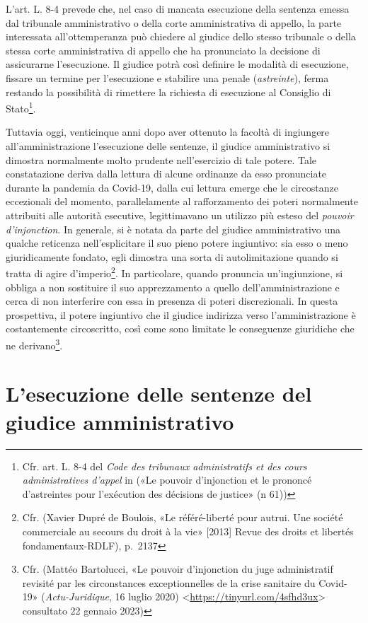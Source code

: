 \documentclass[12pt,it,a4paper,]{report}
\begin{document}
L'art. L. 8-4 prevede che, nel caso di mancata esecuzione della sentenza
emessa dal tribunale amministrativo o della corte amministrativa di
appello, la parte interessata all'ottemperanza può chiedere al giudice
dello stesso tribunale o della stessa corte amministrativa di appello
che ha pronunciato la decisione di assicurarne l'esecuzione. Il giudice
potrà così definire le modalità di esecuzione, fissare un termine per
l'esecuzione e stabilire una penale (\emph{astreinte}), ferma restando
la possibilità di rimettere la richiesta di esecuzione al Consiglio di
Stato\footnote{Cfr. art. L. 8-4 del \emph{Code des tribunaux
  administratifs et des cours administratives d'appel} in ({«Le pouvoir
  d'injonction et le prononcé d'astreintes pour l'exécution des
  décisions de justice»} (n 61))}.

Tuttavia oggi, venticinque anni dopo aver ottenuto la facoltà di
ingiungere all'amministrazione l'esecuzione delle sentenze, il giudice
amministrativo si dimostra normalmente molto prudente nell'esercizio di
tale potere. Tale constatazione deriva dalla lettura di alcune ordinanze
da esso pronunciate durante la pandemia da Covid-19, dalla cui lettura
emerge che le circostanze eccezionali del momento, parallelamente al
rafforzamento dei poteri normalmente attribuiti alle autorità esecutive,
legittimavano un utilizzo più esteso del \emph{pouvoir d'injonction}. In
generale, si è notata da parte del giudice amministrativo una qualche
reticenza nell'esplicitare il suo pieno potere ingiuntivo: sia esso o
meno giuridicamente fondato, egli dimostra una sorta di autolimitazione
quando si tratta di agire d'imperio\footnote{Cfr. (Xavier Dupré de
  Boulois, {«Le référé-liberté pour autrui. Une société commerciale au
  secours du droit à la vie»} {[}2013{]} Revue des droits et libertés
  fondamentaux-RDLF), p.~2137}. In particolare, quando pronuncia
un'ingiunzione, si obbliga a non sostituire il suo apprezzamento a
quello dell'amministrazione e cerca di non interferire con essa in
presenza di poteri discrezionali. In questa prospettiva, il potere
ingiuntivo che il giudice indirizza verso l'amministrazione è
costantemente circoscritto, così come sono limitate le conseguenze
giuridiche che ne derivano\footnote{Cfr. (Mattéo Bartolucci, {«Le
  pouvoir d'injonction du juge administratif revisité par les
  circonstances exceptionnelles de la crise sanitaire du Covid-19»}
  (\emph{Actu-Juridique}, 16 luglio 2020)
  \textless{}\url{https://tinyurl.com/4sfhd3ux}\textgreater{} consultato
  22 gennaio 2023)}.

\hypertarget{lesecuzione-delle-sentenze-del-giudice-amministrativo}{%
\section{L'esecuzione delle sentenze del giudice
amministrativo}\label{lesecuzione-delle-sentenze-del-giudice-amministrativo}}
\end{document}
